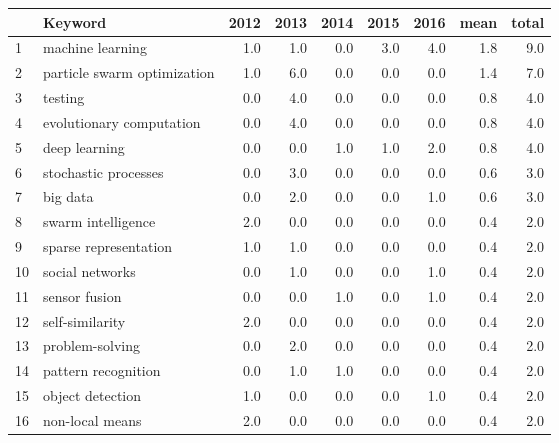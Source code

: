 \begin{tabular}{llrrrrrrr}
\toprule
{} &                                         Keyword &  2012 &  2013 &  2014 &  2015 &  2016 &  mean &  total \\
\midrule
1  &                                machine learning &   1.0 &   1.0 &   0.0 &   3.0 &   4.0 &   1.8 &    9.0 \\
2  &                     particle swarm optimization &   1.0 &   6.0 &   0.0 &   0.0 &   0.0 &   1.4 &    7.0 \\
3  &                                         testing &   0.0 &   4.0 &   0.0 &   0.0 &   0.0 &   0.8 &    4.0 \\
4  &                        evolutionary computation &   0.0 &   4.0 &   0.0 &   0.0 &   0.0 &   0.8 &    4.0 \\
5  &                                   deep learning &   0.0 &   0.0 &   1.0 &   1.0 &   2.0 &   0.8 &    4.0 \\
6  &                            stochastic processes &   0.0 &   3.0 &   0.0 &   0.0 &   0.0 &   0.6 &    3.0 \\
7  &                                        big data &   0.0 &   2.0 &   0.0 &   0.0 &   1.0 &   0.6 &    3.0 \\
8  &                              swarm intelligence &   2.0 &   0.0 &   0.0 &   0.0 &   0.0 &   0.4 &    2.0 \\
9  &                           sparse representation &   1.0 &   1.0 &   0.0 &   0.0 &   0.0 &   0.4 &    2.0 \\
10 &                                 social networks &   0.0 &   1.0 &   0.0 &   0.0 &   1.0 &   0.4 &    2.0 \\
11 &                                   sensor fusion &   0.0 &   0.0 &   1.0 &   0.0 &   1.0 &   0.4 &    2.0 \\
12 &                                 self-similarity &   2.0 &   0.0 &   0.0 &   0.0 &   0.0 &   0.4 &    2.0 \\
13 &                                 problem-solving &   0.0 &   2.0 &   0.0 &   0.0 &   0.0 &   0.4 &    2.0 \\
14 &                             pattern recognition &   0.0 &   1.0 &   1.0 &   0.0 &   0.0 &   0.4 &    2.0 \\
15 &                                object detection &   1.0 &   0.0 &   0.0 &   0.0 &   1.0 &   0.4 &    2.0 \\
16 &                                 non-local means &   2.0 &   0.0 &   0.0 &   0.0 &   0.0 &   0.4 &    2.0 \\

\end{tabular}
